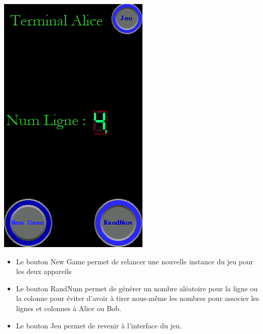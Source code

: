 \documentclass[11pt]{article}
\begin{document}
\includegraphics[]{Interface2.png}

\begin{itemize}
	\item Le bouton New Game permet de relancer une nouvelle instance du jeu pour les deux appareils 
	\item Le bouton RandNum permet de générer un nombre aléatoire pour la ligne ou la colonne pour éviter d'avoir à tirer nous-même les nombres pour associer les lignes et colonnes à Alice ou Bob.
	\item Le bouton Jeu permet de revenir à l'interface du jeu.
\end{itemize}
\end{document}
